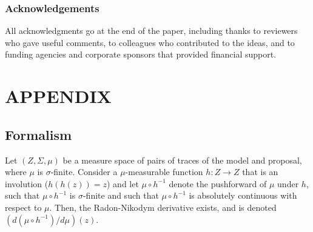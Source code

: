 \documentclass[twoside]{article}
\begin{document}
\subsubsection*{Acknowledgements}
All acknowledgments go at the end of the paper, including thanks to reviewers who gave useful comments, to colleagues who contributed to the ideas, and to funding agencies and corporate sponsors that provided financial support.

 

\clearpage
\onecolumn
\section*{APPENDIX}

\subsection{Formalism}
Let $(Z, \Sigma, \mu)$ be a measure space of pairs of traces of the model and proposal, where $\mu$ is $\sigma$-finite.
Consider a $\mu$-measurable function $h : Z \to Z$ that is an involution ($h(h(z)) = z$) and let $\mu \circ h^{-1}$ denote the pushforward of $\mu$ under $h$, such that $\mu \circ h^{-1}$ is $\sigma$-finite and such that $\mu \circ h^{-1}$ is absolutely continuous with respect to $\mu$.
Then, the Radon-Nikodym derivative exists, and is denoted $(d (\mu \circ h^{-1}) / d \mu)(z)$.
\end{document}
